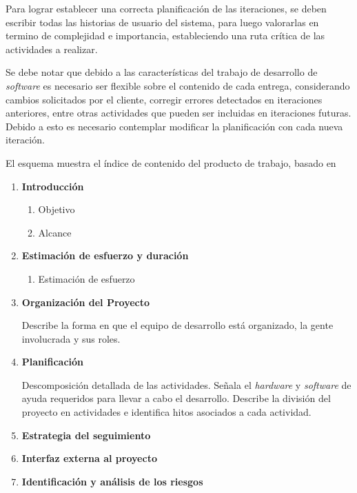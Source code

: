 Para lograr establecer una correcta planificación de las iteraciones, se deben escribir todas las historias de usuario del sistema, para luego valorarlas en termino de complejidad e importancia, estableciendo una ruta crítica de las actividades a realizar. 

Se debe notar que debido a las características del trabajo de desarrollo de \textit{software} es necesario ser flexible sobre el contenido de cada entrega, considerando cambios solicitados por el cliente, corregir errores detectados en iteraciones anteriores, entre otras actividades que pueden ser incluidas en iteraciones futuras. Debido a esto es necesario contemplar modificar la planificación con cada nueva iteración.

El esquema muestra el índice de contenido del producto de trabajo, basado en \citet{mem00}

\begin{framed}
     \begin{enumerate}
		\item \textbf{Introducción}
		\begin{enumerate}
			\item Objetivo
			\item Alcance 
		\end{enumerate}
		\item \textbf{Estimación de esfuerzo y duración}
		\begin{enumerate}
			\item Estimación de esfuerzo
		\end{enumerate}		
		\item \textbf{Organización del Proyecto}

		Describe la forma en que el equipo de desarrollo está organizado, la gente involucrada y sus roles.
		\item \textbf{Planificación}

		Descomposición detallada de las actividades. Señala el \textit{hardware} y \textit{software} de ayuda requeridos para llevar a cabo el desarrollo. Describe la división del proyecto en actividades e identifica hitos asociados a cada actividad.
		\item \textbf{Estrategia del seguimiento}
		\item \textbf{Interfaz externa al proyecto}
		\item \textbf{Identificación y análisis de los riesgos}
	\end{enumerate}
\end{framed}

